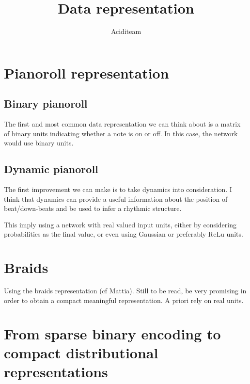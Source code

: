 \documentclass{report}
\title{Data representation}
\author{Aciditeam}
\begin{document}
\maketitle

\section{Pianoroll representation}
\subsection{Binary pianoroll}
The first and most common data representation we can think about is a matrix of binary units indicating whether a note is on or off. In this case, the network would use binary units.

\subsection{Dynamic pianoroll}
The first improvement we can make is to take dynamics into consideration. I think that dynamics can provide a useful information about the position of beat/down-beats and be used to infer a rhythmic structure.

This imply using a network with real valued input units, either by considering probabilities as the final value, or even using Gaussian or preferably ReLu units.

\section{Braids}
Using the braids representation (cf Mattia).
Still to be read, be very promising in order to obtain a compact meaningful representation. A priori rely on real units.

\section{From sparse binary encoding to compact distributional representations}
\end{document}

